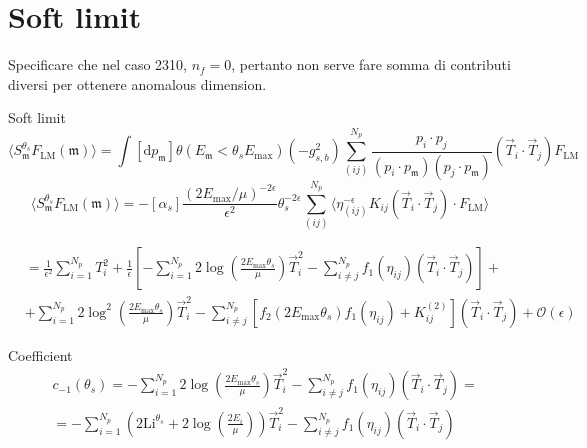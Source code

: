 \documentclass[a4paper, 12pt]{book}
\newcommand{\um}{\mathfrak{m}}
\begin{document}
\section{Soft limit}


Specificare che nel caso 2310, $n_f=0$, pertanto non serve fare somma di contributi diversi per ottenere anomalous dimension.

Soft limit
\begin{equation}
  \langle S_\um^{\theta_s} F_\mathrm{LM}(\um) \rangle = \int [\mathrm{d}p_\um] \theta(E_\um < \theta_s E_{\mathrm{max}}) (-g^2_{s,b}) \sum _{(ij)}^{N_p} \frac{p_i \cdot p_j}{(p_i \cdot p_\um)(p_j \cdot p_\um)} (\vec{T}_i \cdot \vec{T}_j) F_\mathrm{LM}
\end{equation}
\begin{equation}
  \langle S_\um^{\theta_s} F_\mathrm{LM}(\um) \rangle = - [\alpha_s] \frac{\left(2E_{\mathrm{max}}/\mu\right)^{-2\epsilon}}{\epsilon^2} \theta_s^{-2\epsilon}\sum_{(ij)}^{N_p} \langle \eta_{(ij)}^{-\epsilon} K_{ij} (\vec{T}_i \cdot \vec{T}_j) \cdot F_\mathrm{LM} \rangle
\end{equation}

\begin{equation}
  \begin{split}
  & = \frac{1}{\epsilon^2} \sum_{i=1}^{N_p} T_i^2 + \frac{1}{\epsilon}\left[-\sum_{i=1}^{N_p} 2 \log{\left(\frac{2 E_{\mathrm{max}}\theta_s}{\mu} \right)} \vec{T}_i^2 - \sum_{i\neq j}^{N_p} f_1(\eta_{ij}) (\vec{T}_i \cdot \vec{T}_j) \right] + \\
  &  + \sum_{i=1}^{N_p} 2 \log^2{\left(\frac{2 E_{\mathrm{max}}\theta_s}{\mu} \right)}\vec{T}_i^2 - \sum_{i\neq j}^{N_p} \left[ f_2 \left(2 E_{\mathrm{max}}\theta_s\right) f_1(\eta_{ij}) + K_{ij}^{(2)}\right] (\vec{T}_i \cdot \vec{T}_j) + \mathcal{O}(\epsilon)
  \end{split}
\end{equation}

Coefficient
\begin{equation}
  \begin{split}
  & c_{-1}(\theta_s) = -\sum_{i=1}^{N_p} 2 \log{\left(\frac{2 E_{\mathrm{max}}\theta_s}{\mu} \right)} \vec{T}_i^2 - \sum_{i\neq j}^{N_p} f_1(\eta_{ij}) (\vec{T}_i \cdot \vec{T}_j) = \\
  & = -\sum_{i=1}^{N_p} \left( 2 \mathrm{Li}^{\theta_s} + 2 \log{\left(\frac{2 E_i}{\mu} \right) } \right) \vec{T}_i^2 - \sum_{i\neq j}^{N_p} f_1(\eta_{ij}) (\vec{T}_i \cdot \vec{T}_j)
  \end{split}
\end{equation}
\end{document}
